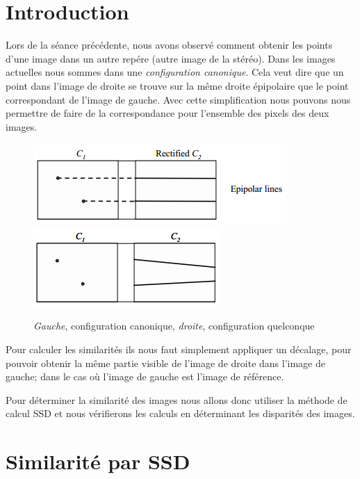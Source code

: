 \documentclass[a4paper,12pt]{report}
\begin{document}


\setcounter{page}{1} 
\newpage

\section*{Introduction}

Lors de la séance précédente, nous avons observé comment obtenir les points d'une image dans un autre repére (autre image de la stéréo). Dans les images actuelles nous sommes dans une \textit{configuration canonique}. Cela veut dire que un point dans l'image de droite se trouve sur la même droite épipolaire que le point correspondant de l'image de gauche. Avec cette simplification nous pouvons nous permettre de faire de la correspondance pour l'ensemble des pixels des deux images.


\begin{figure}[!ht]
	\center
	\includegraphics[scale=0.5]{./image/epipolar2.png}
	\includegraphics[scale=0.5]{./image/epipolar1.png}
	\caption{\textit{Gauche}, configuration canonique, \textit{droite}, configuration quelconque}
\end{figure}


 Pour calculer les similarités ils nous faut simplement appliquer un décalage, pour pouvoir obtenir la même partie visible de l'image de droite dans l'image de gauche; dans le cas où l'image de gauche est l'image de référence.

Pour déterminer la similarité des images nous allons donc utiliser la méthode de calcul SSD et nous vérifierons les calculs en déterminant les disparités des images.

\section*{Similarité par SSD}
\end{document}
